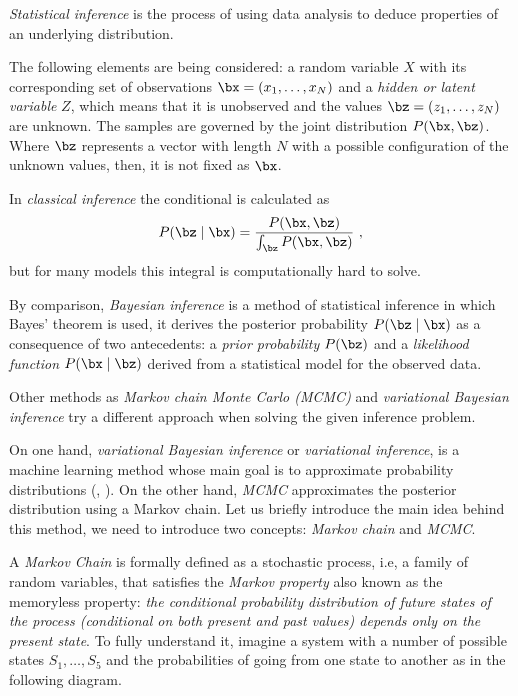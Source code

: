 
\emph{Statistical inference} is the process of using data analysis to deduce properties of an underlying distribution.

The following elements are being considered: a random variable \(X\) with its corresponding set of observations \(\bx = (x_{1},\dots, x_{N})\) and a \emph{hidden or latent variable} \(Z\), which means that it is unobserved and the values \(\bz = (z_{1}, \dots, z_{N})\) are unknown. The samples are governed by the joint distribution \(P(\bx, \bz)\). Where \(\bz\) represents a vector with length \(N\) with a possible configuration of the unknown values, then, it is not fixed as \(\bx\).

In \emph{classical inference} the conditional is calculated as
\[
  P(\bz \mid \bx) = \frac{P(\bx, \bz)}{\int_{\bz} P(\bx,\bz)}\ ,
\]
but for many models this integral is computationally hard to solve.

By comparison, \emph{Bayesian inference} is a method of statistical inference in which Bayes' theorem is used, it derives the posterior probability \(P(\bz \mid \bx)\) as a consequence of two antecedents: a \emph{prior probability} \(P(\bz)\) and a \emph{likelihood function} \(P(\bx \mid \bz)\)  derived from a statistical model for the observed data.

Other methods as \emph{Markov chain Monte Carlo (MCMC)} and \emph{variational Bayesian inference} try a different approach when solving the given inference problem.

On one hand, \emph{variational Bayesian inference} or \emph{variational inference}, is a machine learning method whose main goal is to approximate probability distributions (\cite{jordan1999introduction}, \cite{wainwright}). On the other hand, \emph{MCMC} approximates the posterior distribution using a Markov chain. Let us briefly introduce the main idea behind this method, we need to introduce two concepts: \emph{Markov chain} and \emph{MCMC}.

A \emph{Markov Chain} is formally defined as a stochastic process, i.e, a family of random variables, that satisfies the \emph{Markov property} also known as the memoryless property: \textit{the conditional probability distribution of future states of the process (conditional on both present and past values) depends only on the present state}. To fully understand it, imagine a system with a number of possible states \(S_{1},\dots,S_{5}\) and the probabilities of going from one state to another as in the following diagram.

